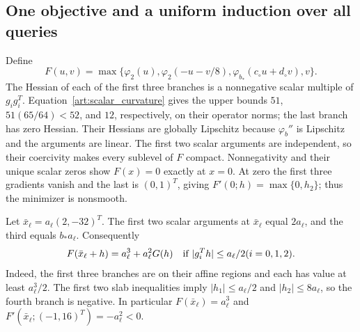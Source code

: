 \subsection{One objective and a uniform induction over all queries}
Define
\begin{equation}\label{art:upper_objective}
 F(u,v)=\max\{\varphi_2(u),\varphi_2(-u-v/8),
                    \varphi_{b_*}(c_\circ u+d_\circ v),v\}.
\end{equation}
The Hessian of each of the first three branches is a nonnegative scalar
multiple of $g_ig_i^T$. Equation~\eqref{art:scalar_curvature} gives the
upper bounds $51$, $51(65/64)<52$, and $12$, respectively, on their
operator norms; the last branch has zero Hessian. Their Hessians are
globally Lipschitz because $\varphi_b''$ is Lipschitz and the arguments
are linear. The first two scalar arguments are independent, so their
coercivity makes every sublevel of $F$ compact. Nonnegativity and their
unique scalar zeros show $F(x)=0$ exactly at $x=0$. At zero the first
three gradients vanish and the last is $(0,1)^T$, giving
$F'(0;h)=\max\{0,h_2\}$; thus the minimizer is nonsmooth.

Let $\bar x_\ell=a_\ell(2,-32)^T$. The first two scalar arguments at $\bar x_\ell$ equal
$2a_\ell$, and the third equals $b_*a_\ell$. Consequently
\begin{equation}\label{art:upper_local_model}
 F(\bar x_\ell+h)=a_\ell^3+a_\ell^2G(h)
 \quad\hbox{if } |g_i^Th|\le a_\ell/2 (i=0,1,2).
\end{equation}
Indeed, the first three branches are on their affine regions and each
has value at least $a_\ell^3/2$. The first two slab inequalities imply
$|h_1|\le a_\ell/2$ and $|h_2|\le8a_\ell$, so the fourth branch is negative.
In particular $F(\bar x_\ell)=a_\ell^3$ and
$F'(\bar x_\ell;(-1,16)^T)=-a_\ell^2<0$.

